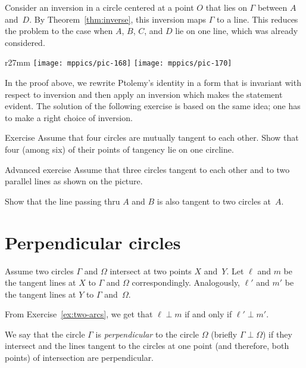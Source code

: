 Consider an inversion in a circle centered at a point $O$ that lies on $\Gamma$ between $A$ and~$D$.
By 
Theorem~\ref{thm:inverse},
this inversion maps $\Gamma$ to a line.
This reduces the problem to the case when $A$, $B$, $C$, and $D$ lie on one line, which was already considered.
\qeds

{

\begin{wrapfigure}{r}{27mm}
\vskip-4mm
\centering
\texttt{[image: mppics/pic-168]}
\vskip4mm
\texttt{[image: mppics/pic-170]}
\end{wrapfigure}


In the proof above, we rewrite Ptolemy's identity in a form that is invariant with respect to inversion 
and then apply an inversion which makes the statement evident.
The solution of the following exercise is based on the same idea;
one has to make a right choice of inversion.



\begin{thm}{Exercise}\label{ex:4-circles}
Assume that four circles are mutually tangent to each other.
Show that four (among six) of their points of tangency lie on one circline.
\end{thm}


\begin{thm}{Advanced exercise}\label{ex:inverse}
Assume that three circles tangent to each other and to two parallel lines as shown on the picture.

Show that the line passing thru $A$ and $B$ is also tangent to two circles at~$A$.
\end{thm}

}

\section*{Perpendicular circles}

Assume two circles $\Gamma$ and $\Omega$ intersect at two points $X$ and~$Y$.
Let $\ell$ and $m$ be the tangent lines at $X$ to $\Gamma$ and $\Omega$ correspondingly.
Analogously, $\ell'$ and $m'$ be the tangent lines at $Y$ to $\Gamma$ and~$\Omega$.

From Exercise~\ref{ex:two-arcs}, we get that  
 $\ell\perp m$ if and only if $\ell'\perp m'$.

We say that the circle $\Gamma$ is {}\emph{perpendicular} to the circle $\Omega$ 
(briefly $\Gamma\perp \Omega$)
if they intersect and the lines tangent to the circles at one point 
(and therefore, both points) 
of intersection are perpendicular.

